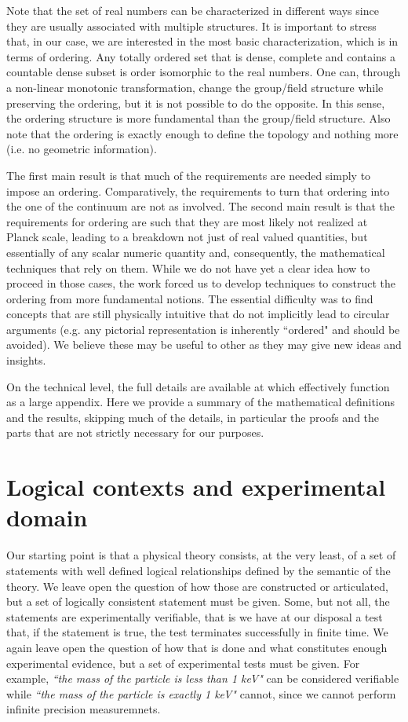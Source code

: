 \documentclass{article}
\newcommand{\statement}[1] {\emph{``#1"}}
\begin{document}
Note that the set of real numbers can be characterized in different ways since they are usually associated with multiple structures. It is important to stress that, in our case, we are interested in the most basic characterization, which is in terms of ordering. Any totally ordered set that is dense, complete and contains a countable dense subset is order isomorphic to the real numbers. One can, through a non-linear monotonic transformation, change the group/field structure while preserving the ordering, but it is not possible to do the opposite. In this sense, the ordering structure is more fundamental than the group/field structure. Also note that the ordering is exactly enough to define the topology and nothing more (i.e. no geometric information).

The first main result is that much of the requirements are needed simply to impose an ordering. Comparatively, the requirements to turn that ordering into the one of the continuum are not as involved. The second main result is that the requirements for ordering are such that they are most likely not realized at Planck scale, leading to a breakdown not just of real valued quantities, but essentially of any scalar numeric quantity and, consequently, the mathematical techniques that rely on them. While we do not have yet a clear idea how to proceed in those cases, the work forced us to develop techniques to construct the ordering from more fundamental notions. The essential difficulty was to find concepts that are still physically intuitive that do not implicitly lead to circular arguments (e.g. any pictorial representation is inherently ``ordered" and should be avoided). We believe these may be useful to other as they may give new ideas and insights.

On the technical level, the full details are available at \cite{Carc3} which effectively function as a large appendix. Here we provide a summary of the mathematical definitions and the results, skipping much of the details, in particular the proofs and the parts that are not strictly necessary for our purposes.

\section{Logical contexts and experimental domain}

Our starting point is that a physical theory consists, at the very least, of a set of statements with well defined logical relationships defined by the semantic of the theory. We leave open the question of how those are constructed or articulated, but a set of logically consistent statement must be given. Some, but not all, the statements are experimentally verifiable, that is we have at our disposal a test that, if the statement is true, the test terminates successfully in finite time. We again leave open the question of how that is done and what constitutes enough experimental evidence, but a set of experimental tests must be given. For example, \statement{the mass of the particle is less than 1 keV} can be considered verifiable while \statement{the mass of the particle is exactly 1 keV} cannot, since we cannot perform infinite precision measuremnets.
\end{document}
